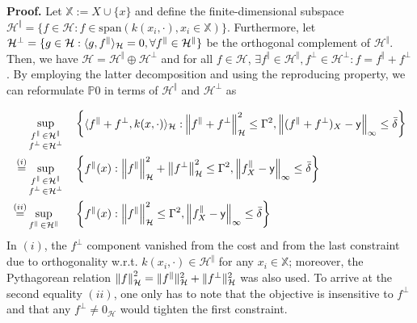 \begin{my_proof}
	\textbf{Proof.}
	\label{app.thmproof}
	Let $\mathds{X} := X \cup \{x\}$ and define the finite-dimensional subspace $\mathcal{H}^\Vert=\{f\in\mathcal{H}: f \in \text{span}(k(x_i,\cdot), x_i \in \mathds{X})\}$. Furthermore, let $\mathcal{H}^\perp = \{g\in \mathcal{H}: \langle g, f^\Vert \rangle_\mathcal{H}=0, \forall f^\Vert \in \mathcal{H}^{\Vert} \}$ be the orthogonal complement of $\mathcal{H}^{\Vert}$. Then, we have $\mathcal{H}=\mathcal{H}^{\Vert} \oplus \mathcal{H}^\perp$ and for all $f\in \mathcal{H}$, $\exists f^{\Vert} \in \mathcal{H}^{\Vert}, f^\perp \in \mathcal{H}^\perp : f = f^{\Vert} + f^\perp$. By employing the latter decomposition and using the reproducing property, we can reformulate $\mathds{P}0$ in terms of $\mathcal{H}^{\Vert}$ and $\mathcal{H}^\perp$ as
	
	\begin{align}
		& \sup_{\substack{f^{\Vert} \, \in \mathcal{H}^{\Vert} \\ f^\perp \, \in \mathcal{H}^\perp}} &&\left\{ 
		\begin{aligned}
			&\langle f^{\Vert}+f^\perp, k(x,\cdot) \rangle_\mathcal{H} : \hspace{-8pt}&\left\| f^{\Vert}+f^\perp \right\|_\mathcal{H}^2 \leq \Gamma^2, \left\| (f^{\Vert}+f^\perp)_X - \mathsf{y} \right\|_\infty \leq \bar \delta 
		\end{aligned}
		\right\} 
		\\
		\overset{(i)}{=}& \sup_{\substack{f^{\Vert} \, \in \mathcal{H}^{\Vert} \\ f^\perp \, \in \mathcal{H}^\perp}} &&\left\{ f^{\Vert}(x) : \left\| f^{\Vert} \right\|_\mathcal{H}^2+\left\| f^\perp \right\|_\mathcal{H}^2 \leq \Gamma^2, \left\| f_{X}^\Vert - \mathsf{y} \right\|_\infty \leq \bar \delta \right\} \\
		\overset{(ii)}{=}& \sup_{f^{\Vert} \, \in \mathcal{H}^{\Vert}} &&\left\{ f^{\Vert}(x) : \left\| f^{\Vert} \right\|_\mathcal{H}^2 \leq \Gamma^2, \left\| f^{\Vert}_{X} - \mathsf{y} \right\|_\infty \leq \bar \delta \right\} \label{eq.last}
	\end{align}
	In $(i)$, the $f^\perp$ component vanished from the cost and from the last constraint due to orthogonality w.r.t. $k(x_i,\cdot) \in \mathcal{H}^\Vert$ for any $x_i \in \mathds{X}$; moreover, the Pythagorean relation $\left\| f \right\|_\mathcal{H}^2 = \Vert f^{\Vert} \Vert^2_{\mathcal{H}} + \Vert f^\perp \Vert^2_{\mathcal{H}}$ was also used. To arrive at the second equality $(ii)$, one only has to note that the objective is insensitive to $f^\perp$ and that any $f^\perp \neq 0_{\mathcal{H}}$ would tighten the first constraint. 
	

\end{my_proof}
